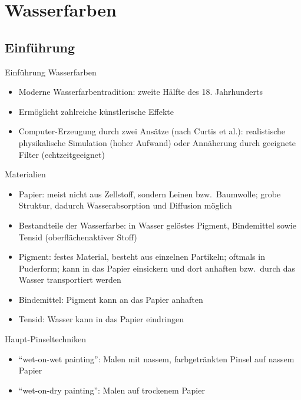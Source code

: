 \section{Wasserfarben}
\subsection{Einführung}
\begin{frame}{Einführung Wasserfarben}
  \begin{itemize}
    \item Moderne Wasserfarbentradition: zweite Hälfte des 18. Jahrhunderts
    \item Ermöglicht zahlreiche künstlerische Effekte
    \item Computer-Erzeugung durch zwei Ansätze (nach Curtis et al.): 
    realistische physikalische Simulation (hoher Aufwand) oder Annäherung durch 
    geeignete Filter (echtzeitgeeignet)
  \end{itemize}
\end{frame}

\begin{frame}{Materialien}
  \begin{itemize} 
    \item Papier: meist nicht aus Zellstoff, sondern Leinen bzw.\ Baumwolle;
    grobe Struktur, dadurch Wasserabsorption und Diffusion möglich
    \item Bestandteile der Wasserfarbe: in Wasser gelöstes Pigment, Bindemittel
    sowie Tensid (oberflächenaktiver Stoff)
    \item Pigment: festes Material, besteht aus einzelnen Partikeln; oftmals in
    Puderform; kann in das Papier einsickern und dort anhaften bzw.\ durch das
    Wasser transportiert werden
    \item Bindemittel: Pigment kann an das Papier anhaften
    \item Tensid: Wasser kann in das Papier eindringen
  \end{itemize}
\end{frame}

\begin{frame}{Haupt-Pinseltechniken}
  \begin{itemize}
    \item "`wet-on-wet painting"': Malen mit nassem, farbgetränkten Pinsel auf
    nassem Papier
    \item "`wet-on-dry painting"': Malen auf trockenem Papier
  \end{itemize}
\end{frame}

